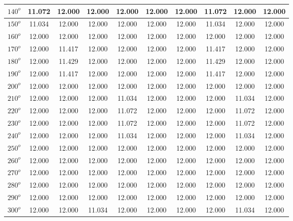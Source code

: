 \begin{table}[H]
\begin{tabular}{|c|c|c|c|c|c|c|c|c|c|}
	         $140^{o}$ & 11.072 & 12.000 & 12.000 & 12.000 & 12.000 & 12.000 & 11.072 & 12.000 & 12.000  \\
	         \hline
	         $150^{o}$ & 11.034 & 12.000 & 12.000 & 12.000 & 12.000 & 12.000 & 11.034 & 12.000 & 12.000\\
	         \hline
	         $160^{o}$ & 12.000 & 12.000 & 12.000 & 12.000 & 12.000 & 12.000 & 12.000& 12.000 & 12.000  \\
	         \hline
	         $170^{o}$ & 12.000 & 11.417 & 12.000 & 12.000 & 12.000 & 12.000 & 11.417 & 12.000 & 12.000  \\
	         \hline
	         $180^{o}$ & 12.000 & 11.429 & 12.000 & 12.000 & 12.000 & 12.000 & 11.429 & 12.000 & 12.000  \\
	         \hline
	         $190^{o}$ & 12.000 & 11.417 & 12.000 & 12.000 & 12.000 & 12.000 & 11.417 & 12.000 & 12.000  \\
	         \hline
	         $200^{o}$ & 12.000 & 12.000 & 12.000 & 12.000 & 12.000 & 12.000 & 12.000& 12.000 & 12.000  \\
	         \hline
	         $210^{o}$ & 12.000 & 12.000 & 12.000 & 11.034 & 12.000 & 12.000 & 12.000 & 11.034 & 12.000  \\
	         \hline
	         $220^{o}$ & 12.000 & 12.000 & 12.000 & 11.072 & 12.000 & 12.000 & 12.000&  11.072 & 12.000  \\
	         \hline
	         $230^{o}$ & 12.000 & 12.000 & 12.000 & 11.072 & 12.000 & 12.000 & 12.000& 11.072 & 12.000  \\
	         \hline
	         $240^{o}$ & 12.000 & 12.000 & 12.000 & 11.034 & 12.000 & 12.000 & 12.000& 11.034 & 12.000  \\
	         \hline
	         $250^{o}$ & 12.000 & 12.000 & 12.000 & 12.000 & 12.000 & 12.000 & 12.000& 12.000 & 12.000  \\
	         \hline
	         $260^{o}$ & 12.000 & 12.000 & 12.000 & 12.000 & 12.000 & 12.000 & 12.000& 12.000 & 12.000  \\
	         \hline
	         $270^{o}$ & 12.000 & 12.000 & 12.000 & 12.000 & 12.000 & 12.000 & 12.000& 12.000 & 12.000  \\
	         \hline
	         $280^{o}$ & 12.000 & 12.000 & 12.000 & 12.000 & 12.000 & 12.000 & 12.000& 12.000 & 12.000  \\
	         \hline
	         $290^{o}$ & 12.000 & 12.000 & 12.000 & 12.000 & 12.000 & 12.000 & 12.000& 12.000 & 12.000  \\
	         \hline
	         $300^{o}$ & 12.000 & 12.000 & 11.034 & 12.000 & 12.000 & 12.000 & 12.000& 11.034 & 12.000  \\

\end{tabular}
\end{table}
